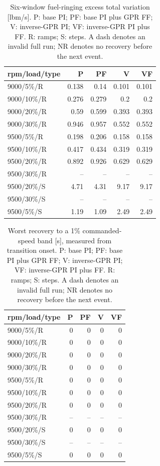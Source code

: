 \documentclass[11pt,a4paper]{article}
\begin{document}
\begin{table}[H]\centering\small
\begin{tabular}{@{}lrrrr@{}}\toprule
rpm/load/type & P & PF & V & VF\\\midrule
9000/5\%/R & 0.138 & 0.14 & 0.101 & 0.101\\
9000/10\%/R & 0.276 & 0.279 & 0.2 & 0.2\\
9000/20\%/R & 0.59 & 0.599 & 0.393 & 0.393\\
9000/30\%/R & 0.946 & 0.957 & 0.552 & 0.552\\
9500/5\%/R & 0.198 & 0.206 & 0.158 & 0.158\\
9500/10\%/R & 0.417 & 0.434 & 0.319 & 0.319\\
9500/20\%/R & 0.892 & 0.926 & 0.629 & 0.629\\
9500/30\%/R & -- & -- & -- & --\\
9500/20\%/S & 4.71 & 4.31 & 9.17 & 9.17\\
9500/30\%/S & -- & -- & -- & --\\
9500/5\%/S & 1.19 & 1.09 & 2.49 & 2.49\\
\bottomrule\end{tabular}\caption{Six-window fuel-ringing excess total variation [lbm/s]. P: base PI; PF: base PI plus GPR FF; V: inverse-GPR PI; VF: inverse-GPR PI plus FF. R: ramps; S: steps. A dash denotes an invalid full run; NR denotes no recovery before the next event.}\end{table}

\clearpage
\begin{table}[H]\centering\small
\begin{tabular}{@{}lrrrr@{}}\toprule
rpm/load/type & P & PF & V & VF\\\midrule
9000/5\%/R & 0 & 0 & 0 & 0\\
9000/10\%/R & 0 & 0 & 0 & 0\\
9000/20\%/R & 0 & 0 & 0 & 0\\
9000/30\%/R & 0 & 0 & 0 & 0\\
9500/5\%/R & 0 & 0 & 0 & 0\\
9500/10\%/R & 0 & 0 & 0 & 0\\
9500/20\%/R & 0 & 0 & 0 & 0\\
9500/30\%/R & -- & -- & -- & --\\
9500/20\%/S & 0 & 0 & 0 & 0\\
9500/30\%/S & -- & -- & -- & --\\
9500/5\%/S & 0 & 0 & 0 & 0\\
\bottomrule\end{tabular}\caption{Worst recovery to a 1\% commanded-speed band [s], measured from transition onset. P: base PI; PF: base PI plus GPR FF; V: inverse-GPR PI; VF: inverse-GPR PI plus FF. R: ramps; S: steps. A dash denotes an invalid full run; NR denotes no recovery before the next event.}\end{table}
\end{document}
